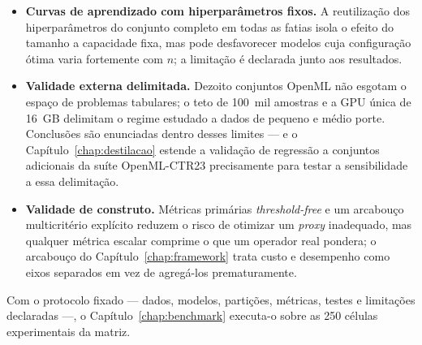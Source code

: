 \begin{itemize}
    pequeno e um grande (\texttt{credit\_g}, mil amostras, e
    \texttt{cardiovascular\_\allowbreak disease}, 70~mil; o teto do
    benchmark é 100~mil) confirmou que os
    \emph{rankings} de latência entre os 14 modelos são estáveis entre
    conjuntos (correlação de postos de Spearman 0{,}78--0{,}95) e que a dependência do contexto
    dos \emph{foundation models} tem o sentido esperado --- cresce
    com o contexto --- (TabPFN: 840
    $\mu$s/linha no menor conjunto, 45.578 no maior). Os números não se
    transferem para serviço \emph{online} de linha única nem para outro
    hardware; o que se transfere --- e é o que as conclusões usam --- são
    as ordens de grandeza entre famílias.
  \item \textbf{Curvas de aprendizado com hiperparâmetros fixos.} A reutilização
    dos hiperparâmetros do conjunto completo em todas as fatias isola o
    efeito do tamanho a capacidade fixa, mas pode desfavorecer modelos cuja
    configuração ótima varia fortemente com $n$; a limitação é declarada
    junto aos resultados.
  \item \textbf{Validade externa delimitada.} Dezoito conjuntos OpenML não
    esgotam o espaço de problemas tabulares; o teto de 100~mil amostras e a
    GPU única de 16~GB delimitam o regime estudado a dados de pequeno e
    médio porte. Conclusões são enunciadas dentro desses limites --- e o
    Capítulo~\ref{chap:destilacao} estende a validação de regressão a
    conjuntos adicionais da suíte OpenML-CTR23 \citep{fischer2023}
    precisamente para testar a sensibilidade a essa delimitação.
  \item \textbf{Validade de construto.} Métricas primárias
    \emph{threshold-free} e um arcabouço multicritério explícito reduzem o
    risco de otimizar um \emph{proxy} inadequado, mas qualquer métrica
    escalar comprime o que um operador real pondera; o arcabouço do
    Capítulo~\ref{chap:framework} trata custo e desempenho como eixos
    separados em vez de agregá-los prematuramente.
\end{itemize}

Com o protocolo fixado --- dados, modelos, partições, métricas, testes e
limitações declaradas ---, o Capítulo~\ref{chap:benchmark} executa-o sobre
as 250 células experimentais da matriz.
